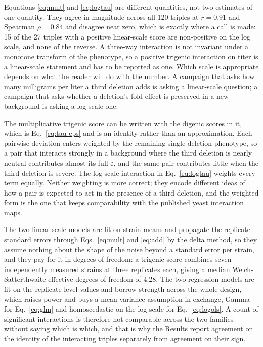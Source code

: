  Equations
\ref{eq:mult} and \ref{eq:logtau} are different quantities, not two estimates of one
quantity. They agree in magnitude across all 120 triples at $r = 0.91$ and
Spearman $\rho = 0.84$ and disagree near zero, which is exactly where a call is made: 15 of
the 27 triples with a positive linear-scale score are non-positive on the log scale, and
none of the reverse. A three-way interaction is not invariant under a monotone transform of
the phenotype, so a positive trigenic interaction on titer is a linear-scale statement and
has to be reported as one. Which scale is appropriate depends on what the reader will do
with the number. A campaign that asks how many milligrams per liter a third deletion adds
is asking a linear-scale question; a campaign that asks whether a deletion's fold effect is
preserved in a new background is asking a log-scale one.

 The multiplicative
trigenic score can be written with the digenic scores in it, which is Eq.~\ref{eq:tau-eps}
and is an identity rather than an approximation. Each pairwise deviation enters weighted by
the remaining single-deletion phenotype, so a pair that interacts strongly in a background
where the third deletion is nearly neutral contributes almost its full $\varepsilon$, and
the same pair contributes little when the third deletion is severe. The log-scale
interaction in Eq.~\ref{eq:logtau} weights every term equally. Neither weighting is more
correct; they encode different ideas of how a pair is expected to act in the presence of a
third deletion, and the weighted form is the one that keeps comparability with the
published yeast interaction maps.

 The two linear-scale models are
fit on strain means and propagate the replicate standard errors through
Eqs.~\ref{eq:mult} and \ref{eq:add} by the delta method, so they assume nothing about the
shape of the noise beyond a standard error per strain, and they pay for it in degrees of
freedom: a trigenic score combines seven independently measured strains at three replicates
each, giving a median Welch-Satterthwaite effective degrees of freedom of 4.28. The two
regression models are fit on the replicate-level values and borrow strength across the
whole design, which raises power and buys a mean-variance assumption in exchange, Gamma for
Eq.~\ref{eq:glm} and homoscedastic on the log scale for Eq.~\ref{eq:logols}. A count of
significant interactions is therefore not comparable across the two families without saying
which is which, and that is why the Results report agreement on the identity of the
interacting triples separately from agreement on their sign.

